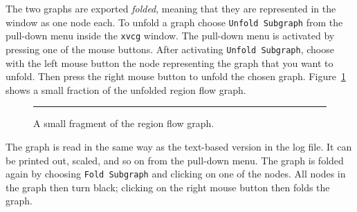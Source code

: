 \documentclass[12pt]{book}
\begin{document}
The two graphs are exported \emph{folded}, meaning that they are
represented in the window as one node each. To unfold a graph choose
{\tt Unfold Subgraph} from the pull-down menu inside the {\tt xvcg}
window. The pull-down menu is activated by pressing one of the mouse
buttons. After activating {\tt Unfold Subgraph}, choose with the left mouse button the node
representing the graph that you want to unfold. Then press the right
mouse button to unfold the chosen graph. Figure~\ref{vcg2.fig}
shows a small fraction of the unfolded region flow graph.
\begin{figure}[htb]
\begin{center}
\end{center}
\caption{A small fragment of the region flow graph.}
\label{vcg2.fig}
\medskip\hrule
\end{figure}

The graph is read in the same way as the text-based version in the log
file. It can be printed out, scaled, and so on from the pull-down
menu. The graph is folded again by choosing {\tt Fold Subgraph} and
clicking on one of the nodes. All nodes in the graph then turn black;
clicking on the right mouse button then folds the graph.

\end{document}
